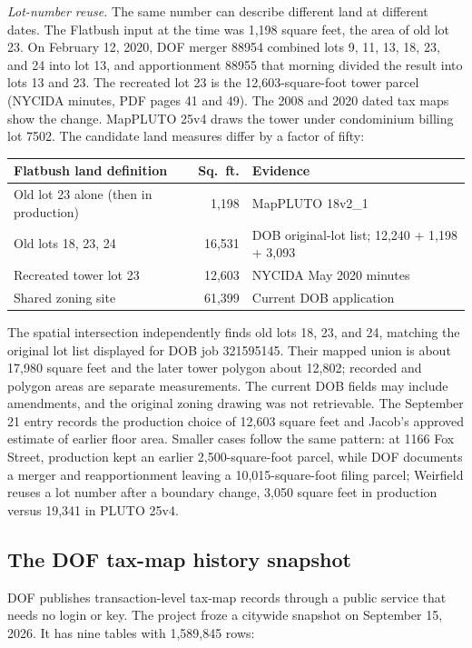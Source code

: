 \textit{Lot-number reuse.} The same number can describe different land at
different dates. The Flatbush input at the time was 1,198 square feet, the
area of old lot 23. On February 12, 2020, DOF merger 88954 combined lots 9, 11,
13, 18, 23, and 24 into lot 13, and apportionment 88955 that morning divided the
result into lots 13 and 23. The recreated lot 23 is the 12,603-square-foot
tower parcel (NYCIDA minutes, PDF pages 41 and 49). The 2008 and 2020 dated tax
maps show the change. MapPLUTO 25v4 draws the tower under condominium billing
lot 7502. The candidate land measures differ by a factor of fifty:

\begin{center}
\small
\begin{tabular}{lrl}
\hline
Flatbush land definition & Sq.\ ft. & Evidence \\
\hline
Old lot 23 alone (then in production) & 1,198 & MapPLUTO 18v2\_1 \\
Old lots 18, 23, 24 & 16,531 & DOB original-lot list; 12,240 + 1,198 + 3,093 \\
Recreated tower lot 23 & 12,603 & NYCIDA May 2020 minutes \\
Shared zoning site & 61,399 & Current DOB application \\
\hline
\end{tabular}
\end{center}

The spatial intersection independently finds old lots 18, 23, and 24, matching
the original lot list displayed for DOB job 321595145. Their mapped union is
about 17,980 square feet and the later tower polygon about 12,802; recorded and
polygon areas are separate measurements. The current DOB fields may include
amendments, and the original zoning drawing was not retrievable. The September
21 entry records the production choice of 12,603 square feet and Jacob's
approved estimate of earlier floor area. Smaller cases follow the same pattern:
at 1166 Fox Street, production kept an earlier 2,500-square-foot parcel,
while DOF documents a merger and reapportionment leaving a 10,015-square-foot
filing parcel; Weirfield reuses a lot number after a boundary change, 3,050
square feet in production versus 19,341 in PLUTO 25v4.

\subsection*{The DOF tax-map history snapshot}

DOF publishes transaction-level tax-map records through a public service that
needs no login or key. The project froze a citywide snapshot on September 15,
2026. It has nine tables with 1,589,845 rows:

